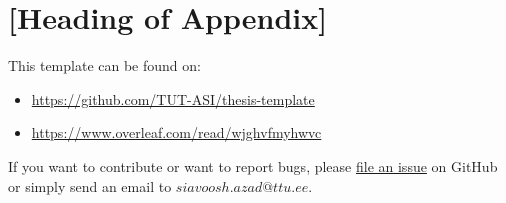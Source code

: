 \section{[Heading of Appendix]}
This template can be found on:
\begin{itemize}
\item \url{https://github.com/TUT-ASI/thesis-template}
\item \url{https://www.overleaf.com/read/wjghvfmyhwvc}
\end{itemize}


If you want to contribute or want to report bugs, please
\href{https://github.com/TUT-ASI/thesis-template/issues}{file an issue}
on GitHub or simply send an email to $siavoosh.azad@ttu.ee$.
